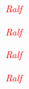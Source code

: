 \documentclass{article}
\def\foo{\textcolor{red}{\emph{\Large Ralf}}}
\begin{document}
\begin{rotate}{0}
  \foo
\end{rotate}
\hspace*{1cm}
\begin{rotate}{15}
  \foo
\end{rotate}
\hspace*{1cm}
\begin{rotate}{45}
  \foo
\end{rotate}
\hspace*{1cm}
\begin{rotate}{90}
  \foo
\end{rotate}
\end{document}
